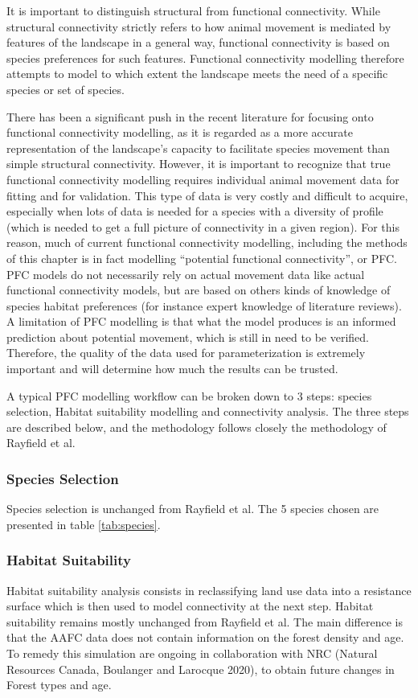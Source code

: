 It is important to distinguish structural from functional connectivity. While structural connectivity strictly refers to how animal movement is mediated by features of the landscape in a general way, functional connectivity is based on species preferences for such features. Functional connectivity modelling therefore attempts to model to which extent the landscape meets the need of a specific species or set of species.

There has been a significant push in the recent literature for focusing onto functional connectivity modelling, as it is regarded as a more accurate representation of  the landscape’s capacity to facilitate species movement than simple structural connectivity. However, it is important to recognize that true functional connectivity modelling requires individual animal movement data for fitting and for validation. This type of data is very costly and difficult to acquire, especially when lots of data is needed for a species with a diversity of profile (which is needed to get a full picture of connectivity in a given region). For this reason, much of current functional connectivity modelling, including the methods of this chapter is in fact modelling “potential functional connectivity”, or PFC. PFC models do not necessarily rely on actual movement data like actual functional connectivity models, but are based on others kinds of knowledge of species habitat preferences (for instance expert knowledge of literature reviews). A limitation of PFC modelling is that what the model produces is an informed prediction about potential movement, which is still in need to be verified. Therefore, the quality of the data used for parameterization is extremely important and will determine how much the results can be trusted.

A typical PFC modelling workflow can be broken down to 3 steps: species selection, Habitat suitability modelling and connectivity analysis. The three steps are described below, and the methodology follows closely the methodology of Rayfield et al.\\

\subsubsection{Species Selection}
Species selection is unchanged from Rayfield et al. The 5 species chosen are presented in table \ref{tab:species}.\\

\subsubsection{Habitat Suitability}
Habitat suitability analysis consists in reclassifying land use data into a resistance surface which is then used to model connectivity at the next step.
Habitat suitability remains mostly unchanged from Rayfield et al. The main difference is that the AAFC data does not contain information on the forest density and age. To remedy this simulation are ongoing in collaboration with NRC (Natural Resources Canada, Boulanger and Larocque 2020), to obtain future changes in Forest types and age.\\

